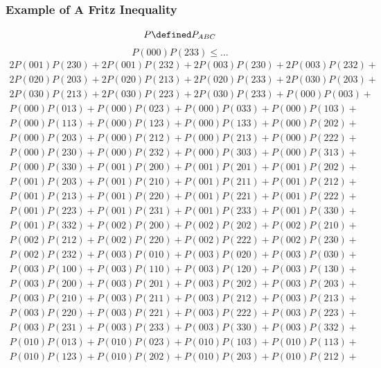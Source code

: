 \documentclass{article}
\theoremstyle{definition}
\begin{document}
    \subsubsection*{Example of A Fritz Inequality}
    \[ P \defined P_{ABC} \]
    \[ P(000)P(233) \leq \ldots \]
    \begin{gather*}
    2P(001)P(230) + 2P(001)P(232) + 2P(003)P(230) + 2P(003)P(232) + \\
    2P(020)P(203) + 2P(020)P(213) + 2P(020)P(233) + 2P(030)P(203) + \\
    2P(030)P(213) + 2P(030)P(223) + 2P(030)P(233) + P(000)P(003) + \\
    P(000)P(013) + P(000)P(023) + P(000)P(033) + P(000)P(103) + \\
    P(000)P(113) + P(000)P(123) + P(000)P(133) + P(000)P(202) + \\
    P(000)P(203) + P(000)P(212) + P(000)P(213) + P(000)P(222) + \\
    P(000)P(230) + P(000)P(232) + P(000)P(303) + P(000)P(313) + \\
    P(000)P(330) + P(001)P(200) + P(001)P(201) + P(001)P(202) + \\
    P(001)P(203) + P(001)P(210) + P(001)P(211) + P(001)P(212) + \\
    P(001)P(213) + P(001)P(220) + P(001)P(221) + P(001)P(222) + \\
    P(001)P(223) + P(001)P(231) + P(001)P(233) + P(001)P(330) + \\
    P(001)P(332) + P(002)P(200) + P(002)P(202) + P(002)P(210) + \\
    P(002)P(212) + P(002)P(220) + P(002)P(222) + P(002)P(230) + \\
    P(002)P(232) + P(003)P(010) + P(003)P(020) + P(003)P(030) + \\
    P(003)P(100) + P(003)P(110) + P(003)P(120) + P(003)P(130) + \\
    P(003)P(200) + P(003)P(201) + P(003)P(202) + P(003)P(203) + \\
    P(003)P(210) + P(003)P(211) + P(003)P(212) + P(003)P(213) + \\
    P(003)P(220) + P(003)P(221) + P(003)P(222) + P(003)P(223) + \\
    P(003)P(231) + P(003)P(233) + P(003)P(330) + P(003)P(332) + \\
    P(010)P(013) + P(010)P(023) + P(010)P(103) + P(010)P(113) + \\
    P(010)P(123) + P(010)P(202) + P(010)P(203) + P(010)P(212) + \\

\end{gather*}
\end{document}
